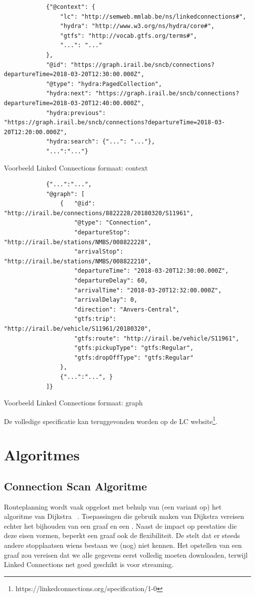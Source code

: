 \begin{code}[h]
	\begin{verbatim}
			{"@context": {
			    "lc": "http://semweb.mmlab.be/ns/linkedconnections#",
			    "hydra": "http://www.w3.org/ns/hydra/core#",
			    "gtfs": "http://vocab.gtfs.org/terms#",
			    "...": "..."
			},
			"@id": "https://graph.irail.be/sncb/connections?departureTime=2018-03-20T12:30:00.000Z",
			"@type": "hydra:PagedCollection",
			"hydra:next": "https://graph.irail.be/sncb/connections?departureTime=2018-03-20T12:40:00.000Z",
			"hydra:previous": "https://graph.irail.be/sncb/connections?departureTime=2018-03-20T12:20:00.000Z",
			"hydra:search": {"...": "..."},
			"...":"..."}
		\end{verbatim}
	\caption{Voorbeeld Linked Connections formaat: context}
	\label{code:2:linkedconnections-response-context}
\end{code}
\begin{code}[h]
	\begin{verbatim}
			{"...":"...",
			"@graph": [
				{   "@id": "http://irail.be/connections/8822228/20180320/S11961",
				    "@type": "Connection",
    				"departureStop": "http://irail.be/stations/NMBS/008822228",
    				"arrivalStop": "http://irail.be/stations/NMBS/008822210",
    				"departureTime": "2018-03-20T12:30:00.000Z",
    				"departureDelay": 60,
    				"arrivalTime": "2018-03-20T12:32:00.000Z",
    				"arrivalDelay": 0,
    				"direction": "Anvers-Central",
    				"gtfs:trip": "http://irail.be/vehicle/S11961/20180320",
    				"gtfs:route": "http://irail.be/vehicle/S11961",
    				"gtfs:pickupType": "gtfs:Regular",
    				"gtfs:dropOffType": "gtfs:Regular"
				},
				{"...":"...", }
			]}
	\end{verbatim}
\caption{Voorbeeld Linked Connections formaat: graph}
\label{code:2:linkedconnections-response-graph}
\end{code}
 
De volledige specificatie kan teruggevonden worden op de LC website\footnote{https://linkedconnections.org/specification/1-0}.
 
\section{Algoritmes}
\label{sec:algoritmes}
\subsection{Connection Scan Algoritme}
\label{sec:csa}
Routeplanning wordt vaak opgelost met behulp van (een variant op) het algoritme van Dijkstra ~\citep{strasser13,hannemann07,hannemann08}. Toepassingen die gebruik maken van Dijkstra vereisen echter het bijhouden van een graaf en een . Naast de impact op prestaties die deze eisen vormen, beperkt een graaf ook de flexibiliteit. De  stelt dat er steeds andere stopplaatsen wiens bestaan we (nog) niet kennen. Het opstellen van een graaf zou vereisen dat we alle gegevens eerst volledig moeten downloaden, terwijl Linked Connections net goed geschikt is voor streaming. 

